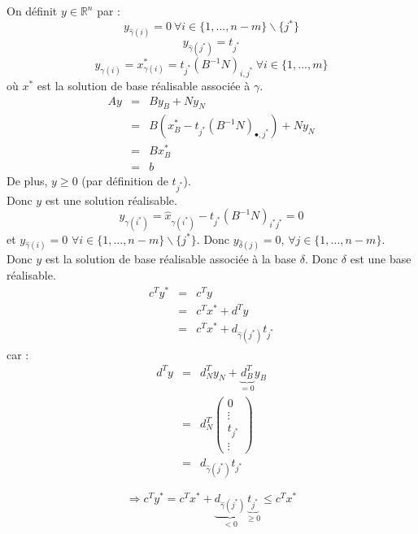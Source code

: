 \begin{dem}
On définit $y\in\mathbb{R}^n$ par :
	\[y_{\hat{\gamma}(i)}=0\ \forall i\in\{1,...,n-m\}\backslash\{j^*\}\]
	\[y_{\hat{\gamma}(j^*)}=t_{j^*}\]
	\[y_{\gamma(i)}=x^*_{\gamma(i)}=t_{j^*}(B^{-1}N)_{i,j^*}\ \forall i\in\{1,...,m\}\]
où $x^*$ est la solution de base réalisable associée à $\gamma$.
\begin{eqnarray*}
	Ay&=&By_B+Ny_N\\
	  &=&B(x^*_B-t_{j^*}(B^{-1}N)_{\bullet,j^*})+Ny_N\\
	  &=&Bx_B^*\\
	  &=&b
\end{eqnarray*}
De plus, $y\geq 0$ (par définition de $t_{j^*}$).\\
Donc $y$ est une solution réalisable.
	\[y_{\gamma(i^*)}=\hat{x}_{\gamma(i^*)}-t_{j^*}(B^{-1}N)_{i^*j^*}=0\]
et $y_{\hat{\gamma}(i)}=0$ $\forall i\in\{1,...,n-m\}\backslash\{j^*\}$. Donc $y_{\hat{\delta}(j)}=0$, $\forall j\in\{1,...,n-m\}$.\\
Donc $y$ est la solution de base réalisable associée à la base $\delta$. Donc $\delta$ est une base réalisable.
\begin{eqnarray*}
	c^Ty^*&=&c^Ty\\
		&=&c^Tx^*+d^Ty\\
		&=&c^Tx^*+d_{\hat{\gamma}(j^*)}t_{j^*}
\end{eqnarray*}
car :
\begin{eqnarray*}
	d^Ty&=&d^T_Ny_N+\underbrace{d^T_B}_{=0}y_B\\
	    &=&d^T_N \begin{pmatrix} 0 \\ \vdots \\ t_{j^*} \\ \vdots \end{pmatrix} \\
	    &=& d_{\hat{\gamma}(j^*)}t_{j^*}
\end{eqnarray*}

\[\Rightarrow c^Ty^*=c^Tx^*+\underbrace{d_{\hat{\gamma}(j^*)}}_{<0}\underbrace{t_{j^*}}_{\geq 0}\leq c^Tx^*\]
\end{dem}


